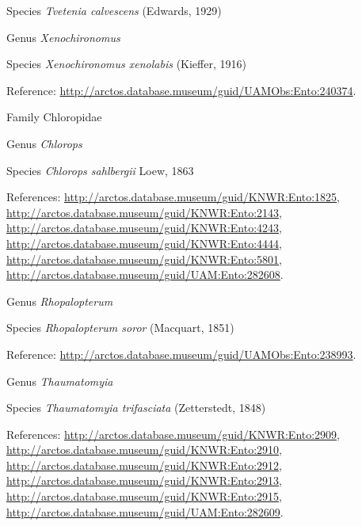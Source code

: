 \documentclass[9pt, article]{memoir}
\begin{document}
\begin{multicols}{2}
\vspace{6pt}\noindent\hspace{36pt}Species \textit{Tvetenia calvescens} (Edwards, 1929)


\vspace{6pt}\noindent\hspace{30pt}Genus \textit{Xenochironomus}


\vspace{6pt}\noindent\hspace{36pt}Species \textit{Xenochironomus xenolabis} (Kieffer, 1916)


Reference: 
\url{http://arctos.database.museum/guid/UAMObs:Ento:240374}.

\vspace{6pt}\noindent\hspace{24pt}Family Chloropidae


\vspace{6pt}\noindent\hspace{30pt}Genus \textit{Chlorops}


\vspace{6pt}\noindent\hspace{36pt}Species \textit{Chlorops sahlbergii} Loew, 1863


References: 
\url{http://arctos.database.museum/guid/KNWR:Ento:1825}, 
\url{http://arctos.database.museum/guid/KNWR:Ento:2143}, 
\url{http://arctos.database.museum/guid/KNWR:Ento:4243}, 
\url{http://arctos.database.museum/guid/KNWR:Ento:4444}, 
\url{http://arctos.database.museum/guid/KNWR:Ento:5801}, 
\url{http://arctos.database.museum/guid/UAM:Ento:282608}.

\vspace{6pt}\noindent\hspace{30pt}Genus \textit{Rhopalopterum}


\vspace{6pt}\noindent\hspace{36pt}Species \textit{Rhopalopterum soror} (Macquart, 1851)


Reference: 
\url{http://arctos.database.museum/guid/UAMObs:Ento:238993}.

\vspace{6pt}\noindent\hspace{30pt}Genus \textit{Thaumatomyia}


\vspace{6pt}\noindent\hspace{36pt}Species \textit{Thaumatomyia trifasciata} (Zetterstedt, 1848)


References: 
\url{http://arctos.database.museum/guid/KNWR:Ento:2909}, 
\url{http://arctos.database.museum/guid/KNWR:Ento:2910}, 
\url{http://arctos.database.museum/guid/KNWR:Ento:2912}, 
\url{http://arctos.database.museum/guid/KNWR:Ento:2913}, 
\url{http://arctos.database.museum/guid/KNWR:Ento:2915}, 
\url{http://arctos.database.museum/guid/UAM:Ento:282609}.


\end{multicols}
\end{document}
